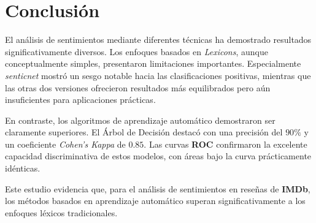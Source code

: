 \documentclass[12pt,letterpaper]{article}
\begin{document}
\section{Conclusión}

El análisis de sentimientos mediante diferentes técnicas ha demostrado resultados significativamente diversos. Los enfoques basados en \textit{Lexicons}, aunque conceptualmente simples, presentaron limitaciones importantes. Especialmente \textit{senticnet} mostró un sesgo notable hacia las clasificaciones positivas, mientras que las otras dos versiones ofrecieron resultados más equilibrados pero aún insuficientes para aplicaciones prácticas.

En contraste, los algoritmos de aprendizaje automático demostraron ser claramente superiores. El Árbol de Decisión destacó con una precisión del $90\%$ y un coeficiente \textit{Cohen's Kappa} de $0.85$. Las curvas \textbf{ROC} confirmaron la excelente capacidad discriminativa de estos modelos, con áreas bajo la curva prácticamente idénticas.

Este estudio evidencia que, para el análisis de sentimientos en reseñas de \textbf{IMDb}, los métodos basados en aprendizaje automático superan significativamente a los enfoques léxicos tradicionales.
\end{document}

